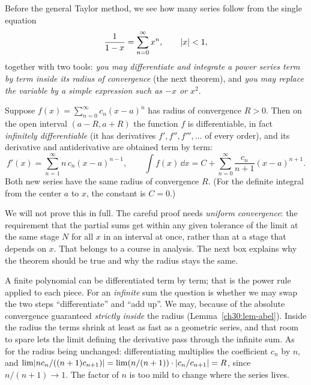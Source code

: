 Before the general Taylor method, we see how many series follow from the single equation
\[
  \frac{1}{1-x} = \sum_{n=0}^{\infty} x^n, \qquad \lvert x\rvert < 1,
\]
together with two tools: \emph{you may differentiate and integrate a power series term by term inside its radius of convergence} (the next theorem), and \emph{you may replace the variable by a simple expression such as $-x$ or $x^2$}.

\begin{theorem}
\label{ch30:thm-termwise}
Suppose $f(x) = \sum_{n=0}^{\infty} c_n (x-a)^n$ has radius of convergence $R > 0$. Then on the open interval $(a-R, a+R)$ the function $f$ is differentiable, in fact \emph{infinitely differentiable} (it has derivatives $f', f'', f''', \dots$ of every order), and its derivative and antiderivative are obtained term by term:
\[
  f'(x) = \sum_{n=1}^{\infty} n\, c_n (x-a)^{n-1},
  \qquad
  \int f(x)\,\dd x = C + \sum_{n=0}^{\infty} \frac{c_n}{n+1}(x-a)^{n+1}.
\]
Both new series have the same radius of convergence $R$. (For the definite integral from the center $a$ to $x$, the constant is $C = 0$.)
\end{theorem}

We will not prove this in full. The careful proof needs \emph{uniform convergence}: the requirement that the partial sums get within any given tolerance of the limit at the same stage $N$ for all $x$ in an interval at once, rather than at a stage that depends on $x$. That belongs to a course in analysis. The next box explains why the theorem should be true and why the radius stays the same.

\begin{whybox}
A finite polynomial can be differentiated term by term; that is the power rule applied to each piece. For an \emph{infinite} sum the question is whether we may swap the two steps ``differentiate'' and ``add up''. We may, because of the absolute convergence guaranteed \emph{strictly inside} the radius (Lemma~\ref{ch30:lem-abel}). Inside the radius the terms shrink at least as fast as a geometric series, and that room to spare lets the limit defining the derivative pass through the infinite sum. As for the radius being unchanged: differentiating multiplies the coefficient $c_n$ by $n$, and $\lim \lvert n c_n / ((n+1)c_{n+1})\rvert = \lim (n/(n+1))\cdot\lvert c_n/c_{n+1}\rvert = R$, since $n/(n+1)\to 1$. The factor of $n$ is too mild to change where the series lives.
\end{whybox}

